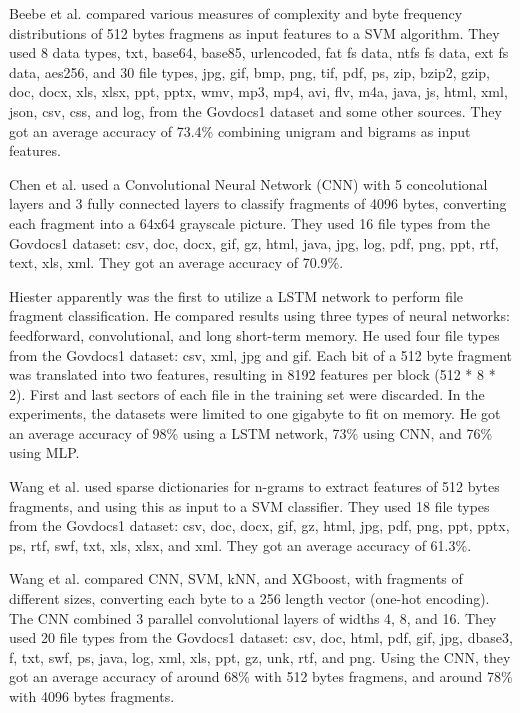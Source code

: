 Beebe et al. \cite{beebe_sceadan:_2013}
compared various measures of complexity and byte frequency distributions of 512 bytes fragmens as input features to a SVM algorithm.
They used 8 data types, txt, base64, base85, urlencoded, fat fs data, ntfs fs data, ext fs data, aes256, and
30 file types, jpg, gif, bmp, png, tif, pdf, ps, zip, bzip2, gzip, doc, docx, xls, xlsx, ppt, pptx, wmv, mp3, mp4, avi, flv, m4a, java, js, html, xml, json, csv, css, and log, from the Govdocs1 dataset and some other sources.
They got an average accuracy of 73.4\% combining unigram and bigrams as input features.

Chen et al. \cite{chen_file_2018}
used a Convolutional Neural Network (CNN) with 5 concolutional layers and 3 fully connected layers to classify fragments of 4096 bytes, converting each fragment into a 64x64 grayscale picture.
They used 16 file types from the Govdocs1 dataset: csv, doc, docx, gif, gz, html, java, jpg, log, pdf, png, ppt, rtf, text, xls, xml.
They got an average accuracy of 70.9\%.

Hiester \cite{hiester_file_2018} apparently was the first to utilize a LSTM network to perform file fragment classification. He compared results using three types of neural networks: feedforward, convolutional, and long short-term memory. He used four file types from the Govdocs1 dataset: csv, xml, jpg and gif. Each bit of a 512 byte fragment was translated into two features, resulting in 8192 features per block (512 * 8 * 2). First and last sectors of each file in the training set were discarded. In the experiments, the datasets were limited to one gigabyte to fit on memory. He got an average accuracy of 98\% using a LSTM network, 73\% using CNN, and 76\% using MLP.

Wang et al. \cite{wang_sparse_2018} 
used sparse dictionaries for n-grams to extract features of 512 bytes fragments, and using this as input to a SVM classifier.
They used 18 file types from the Govdocs1 dataset: csv, doc, docx, gif, gz, html, jpg, pdf, png, ppt, pptx, ps, rtf, swf, txt, xls, xlsx, and xml.
They got an average accuracy of 61.3\%.

Wang et al. \cite{wang_file_2018}  
compared CNN, SVM, kNN, and XGboost, with fragments of different sizes, converting each byte to a 256 length vector (one-hot encoding). The CNN combined 3 parallel convolutional layers of widths 4, 8, and 16.
They used 20 file types from the Govdocs1 dataset: csv, doc, html, pdf, gif, jpg, dbase3, f, txt, swf, ps, java, log, xml, xls, ppt, gz, unk, rtf, and png.
Using the CNN, they got an average accuracy of around 68\% with 512 bytes fragmens, and around 78\% with 4096 bytes fragments.

